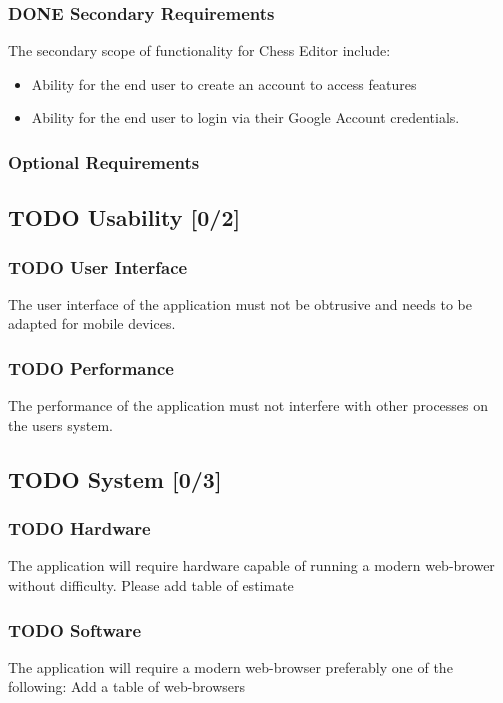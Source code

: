 \documentclass[11pt]{article}
\begin{document}
\subsubsection{{\bfseries\sffamily DONE} Secondary Requirements}
\label{sec:org1390d35}
The secondary scope of functionality for Chess Editor include:
\begin{itemize}
\item Ability for the end user to create an account to access features
\item Ability for the end user to login via their Google Account credentials.
\end{itemize}
\subsubsection{Optional Requirements}
\label{sec:orgb9af487}
\subsection{{\bfseries\sffamily TODO} Usability [0/2]}
\label{sec:orge2ec26e}
\subsubsection{{\bfseries\sffamily TODO} User Interface}
\label{sec:orgdbd0401}
The user interface of the application must not be obtrusive and
needs to be adapted for mobile devices.
\subsubsection{{\bfseries\sffamily TODO} Performance}
\label{sec:org15e218a}
The performance of the application must not interfere with other
processes on the users system.
\subsection{{\bfseries\sffamily TODO} System [0/3]}
\label{sec:org2675774}
\subsubsection{{\bfseries\sffamily TODO} Hardware}
\label{sec:org27dec61}
The application will require hardware capable of running a modern web-brower without difficulty.
Please add table of estimate
\subsubsection{{\bfseries\sffamily TODO} Software}
\label{sec:orge0244f9}
The application will require a modern web-browser preferably one of the following:
Add a table of web-browsers
\end{document}
